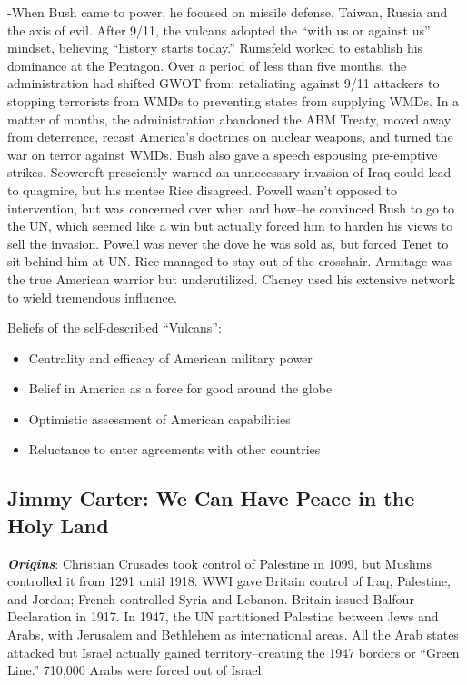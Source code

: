 \documentclass[
]{article}
\begin{document}
-When Bush came to power, he focused on missile defense, Taiwan, Russia
and the axis of evil. After 9/11, the vulcans adopted the ``with us or
against us'' mindset, believing ``history starts today.'' Rumsfeld
worked to establish his dominance at the Pentagon. Over a period of less
than five months, the administration had shifted GWOT from: retaliating
against 9/11 attackers to stopping terrorists from WMDs to preventing
states from supplying WMDs. In a matter of months, the administration
abandoned the ABM Treaty, moved away from deterrence, recast America's
doctrines on nuclear weapons, and turned the war on terror against WMDs.
Bush also gave a speech espousing pre-emptive strikes. Scowcroft
presciently warned an unnecessary invasion of Iraq could lead to
quagmire, but his mentee Rice disagreed. Powell wasn't opposed to
intervention, but was concerned over when and how--he convinced Bush to
go to the UN, which seemed like a win but actually forced him to harden
his views to sell the invasion. Powell was never the dove he was sold
as, but forced Tenet to sit behind him at UN. Rice managed to stay out
of the crosshair. Armitage was the true American warrior but
underutilized. Cheney used his extensive network to wield tremendous
influence.

Beliefs of the self-described ``Vulcans'':

\begin{itemize}
\item
  Centrality and efficacy of American military power
\item
  Belief in America as a force for good around the globe
\item
  Optimistic assessment of American capabilities
\item
  Reluctance to enter agreements with other countries
\end{itemize}

\hypertarget{jimmy-carter-we-can-have-peace-in-the-holy-land}{%
\subsection{Jimmy Carter: We Can Have Peace in the Holy
Land}\label{jimmy-carter-we-can-have-peace-in-the-holy-land}}

\textbf{\emph{Origins}}: Christian Crusades took control of Palestine in
1099, but Muslims controlled it from 1291 until 1918. WWI gave Britain
control of Iraq, Palestine, and Jordan; French controlled Syria and
Lebanon. Britain issued Balfour Declaration in 1917. In 1947, the UN
partitioned Palestine between Jews and Arabs, with Jerusalem and
Bethlehem as international areas. All the Arab states attacked but
Israel actually gained territory--creating the 1947 borders or ``Green
Line.'' 710,000 Arabs were forced out of Israel.
\end{document}
